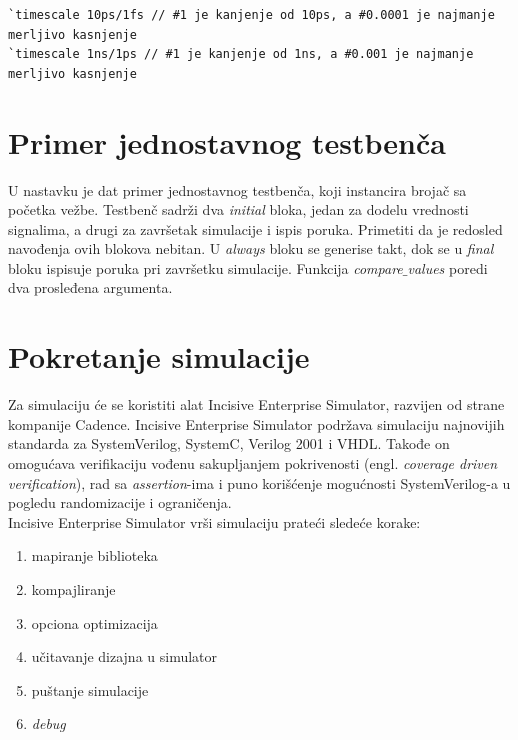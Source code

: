 \begin{lstlisting}
`timescale 10ps/1fs // #1 je kanjenje od 10ps, a #0.0001 je najmanje merljivo kasnjenje
`timescale 1ns/1ps // #1 je kanjenje od 1ns, a #0.001 je najmanje merljivo kasnjenje
\end{lstlisting}


\section{Primer jednostavnog testbenča}

U nastavku je dat primer jednostavnog testbenča, koji instancira brojač sa
početka vežbe. Testbenč sadrži dva \emph{initial} bloka, jedan za dodelu
vrednosti signalima, a drugi za završetak simulacije i ispis poruka. Primetiti
da je redosled navođenja ovih blokova nebitan. U \emph{always} bloku se generise
takt, dok se u \emph{final} bloku ispisuje poruka pri završetku simulacije.
Funkcija \emph{compare\(\_\)values} poredi dva prosleđena argumenta.




\section{Pokretanje simulacije}

Za simulaciju će se koristiti alat Incisive Enterprise Simulator,
razvijen od strane kompanije Cadence. Incisive Enterprise Simulator podržava
simulaciju najnovijih standarda za SystemVerilog, SystemC, Verilog 2001 i VHDL.
Takođe on omogućava verifikaciju vođenu sakupljanjem pokrivenosti (engl. \emph{coverage driven verification}),
rad sa \emph{assertion}-ima i puno korišćenje mogućnosti SystemVerilog-a u pogledu randomizacije i ograničenja.\\

Incisive Enterprise Simulator vrši simulaciju prateći sledeće
korake:
\begin{enumerate}
\item mapiranje biblioteka
\item kompajliranje
\item opciona optimizacija
\item učitavanje dizajna u simulator
\item puštanje simulacije
\item \emph{debug}
\end{enumerate}


